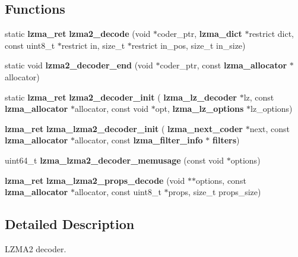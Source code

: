 \subsection*{Functions}
\begin{DoxyCompactItemize}
\item 
\mbox{\label{lzma2__decoder_8c_a9b2dc535105e2316faacf58b727e970b}} 
static \textbf{ lzma\+\_\+ret} {\bfseries lzma2\+\_\+decode} (void $\ast$coder\+\_\+ptr, \textbf{ lzma\+\_\+dict} $\ast$restrict dict, const uint8\+\_\+t $\ast$restrict in, size\+\_\+t $\ast$restrict in\+\_\+pos, size\+\_\+t in\+\_\+size)
\item 
\mbox{\label{lzma2__decoder_8c_ae90fa982273378f8fca24813657b4c75}} 
static void {\bfseries lzma2\+\_\+decoder\+\_\+end} (void $\ast$coder\+\_\+ptr, const \textbf{ lzma\+\_\+allocator} $\ast$allocator)
\item 
\mbox{\label{lzma2__decoder_8c_aebbbe22654e5dc8a8b806bc51eda6d3c}} 
static \textbf{ lzma\+\_\+ret} {\bfseries lzma2\+\_\+decoder\+\_\+init} (\textbf{ lzma\+\_\+lz\+\_\+decoder} $\ast$lz, const \textbf{ lzma\+\_\+allocator} $\ast$allocator, const void $\ast$opt, \textbf{ lzma\+\_\+lz\+\_\+options} $\ast$lz\+\_\+options)
\item 
\mbox{\label{lzma2__decoder_8c_a06f2420551164b6ef499499cbcafaa81}} 
\textbf{ lzma\+\_\+ret} {\bfseries lzma\+\_\+lzma2\+\_\+decoder\+\_\+init} (\textbf{ lzma\+\_\+next\+\_\+coder} $\ast$next, const \textbf{ lzma\+\_\+allocator} $\ast$allocator, const \textbf{ lzma\+\_\+filter\+\_\+info} $\ast$\textbf{ filters})
\item 
\mbox{\label{lzma2__decoder_8c_a1c1e1c878fab104400c9917efc2e2e1c}} 
uint64\+\_\+t {\bfseries lzma\+\_\+lzma2\+\_\+decoder\+\_\+memusage} (const void $\ast$options)
\item 
\mbox{\label{lzma2__decoder_8c_ad31fbaf11f690275372ff5af82e98e67}} 
\textbf{ lzma\+\_\+ret} {\bfseries lzma\+\_\+lzma2\+\_\+props\+\_\+decode} (void $\ast$$\ast$options, const \textbf{ lzma\+\_\+allocator} $\ast$allocator, const uint8\+\_\+t $\ast$props, size\+\_\+t props\+\_\+size)
\end{DoxyCompactItemize}


\subsection{Detailed Description}
L\+Z\+M\+A2 decoder. 

